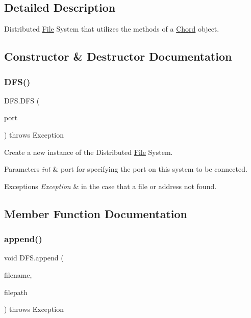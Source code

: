 \subsection{Detailed Description}
Distributed \hyperlink{class_file}{File} System that utilizes the methods of a \hyperlink{class_chord}{Chord} object. 

\subsection{Constructor \& Destructor Documentation}
\mbox{\label{class_d_f_s_ad863806217afcce82e64f5d7d4c124ad}} 
\subsubsection{\texorpdfstring{D\+F\+S()}{DFS()}}
{\footnotesize\ttfamily D\+F\+S.\+D\+FS (\begin{DoxyParamCaption}\item[{int}]{port }\end{DoxyParamCaption}) throws Exception}

Create a new instance of the Distributed \hyperlink{class_file}{File} System. 
\begin{DoxyParams}{Parameters}
{\em int} & port for specifying the port on this system to be connected. \\
\hline
\end{DoxyParams}

\begin{DoxyExceptions}{Exceptions}
{\em Exception} & in the case that a file or address not found. \\
\hline
\end{DoxyExceptions}


\subsection{Member Function Documentation}
\mbox{\label{class_d_f_s_a119519b72f38226815a4b65760701dcf}} 
\subsubsection{\texorpdfstring{append()}{append()}}
{\footnotesize\ttfamily void D\+F\+S.\+append (\begin{DoxyParamCaption}\item[{String}]{filename,  }\item[{String}]{filepath }\end{DoxyParamCaption}) throws Exception}

